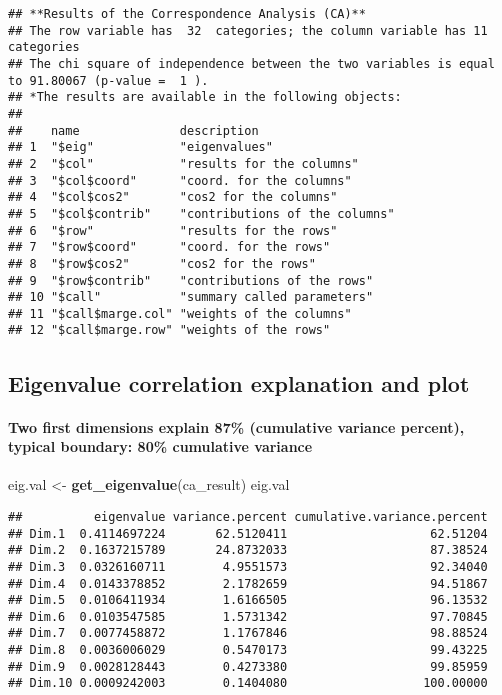 \documentclass[]{article}
\newenvironment{Shaded}{\begin{snugshade}}{\end{snugshade}}
\newcommand{\KeywordTok}[1]{\textcolor[rgb]{0.13,0.29,0.53}{\textbf{#1}}}
\newcommand{\StringTok}[1]{\textcolor[rgb]{0.31,0.60,0.02}{#1}}
\newcommand{\NormalTok}[1]{#1}
\let\oldparagraph\paragraph
\renewcommand{\paragraph}[1]{\oldparagraph{#1}\mbox{}}
\begin{document}
\begin{verbatim}
## **Results of the Correspondence Analysis (CA)**
## The row variable has  32  categories; the column variable has 11 categories
## The chi square of independence between the two variables is equal to 91.80067 (p-value =  1 ).
## *The results are available in the following objects:
## 
##    name              description                   
## 1  "$eig"            "eigenvalues"                 
## 2  "$col"            "results for the columns"     
## 3  "$col$coord"      "coord. for the columns"      
## 4  "$col$cos2"       "cos2 for the columns"        
## 5  "$col$contrib"    "contributions of the columns"
## 6  "$row"            "results for the rows"        
## 7  "$row$coord"      "coord. for the rows"         
## 8  "$row$cos2"       "cos2 for the rows"           
## 9  "$row$contrib"    "contributions of the rows"   
## 10 "$call"           "summary called parameters"   
## 11 "$call$marge.col" "weights of the columns"      
## 12 "$call$marge.row" "weights of the rows"
\end{verbatim}

\subsection{Eigenvalue correlation explanation and
plot}\label{eigenvalue-correlation-explanation-and-plot}

\paragraph{Two first dimensions explain 87\% (cumulative variance
percent), typical boundary: 80\% cumulative
variance}\label{two-first-dimensions-explain-87-cumulative-variance-percent-typical-boundary-80-cumulative-variance}

\begin{Shaded}
\begin{Highlighting}[]
\NormalTok{eig.val <-}\StringTok{ }\KeywordTok{get_eigenvalue}\NormalTok{(ca_result) }
\NormalTok{eig.val }
\end{Highlighting}
\end{Shaded}

\begin{verbatim}
##          eigenvalue variance.percent cumulative.variance.percent
## Dim.1  0.4114697224       62.5120411                    62.51204
## Dim.2  0.1637215789       24.8732033                    87.38524
## Dim.3  0.0326160711        4.9551573                    92.34040
## Dim.4  0.0143378852        2.1782659                    94.51867
## Dim.5  0.0106411934        1.6166505                    96.13532
## Dim.6  0.0103547585        1.5731342                    97.70845
## Dim.7  0.0077458872        1.1767846                    98.88524
## Dim.8  0.0036006029        0.5470173                    99.43225
## Dim.9  0.0028128443        0.4273380                    99.85959
## Dim.10 0.0009242003        0.1404080                   100.00000
\end{verbatim}
\end{document}
